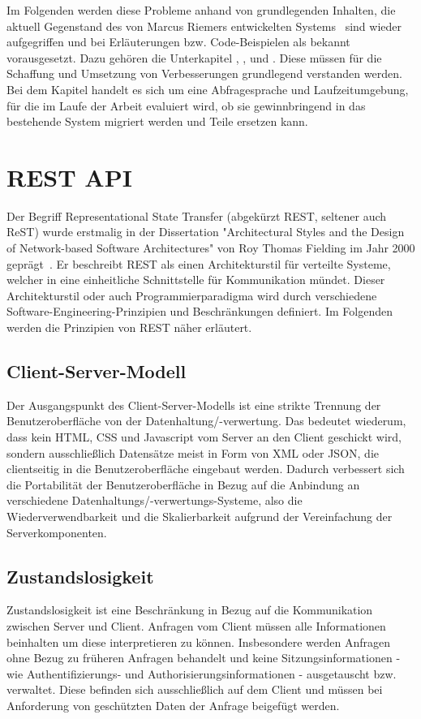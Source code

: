 Im Folgenden werden diese Probleme anhand von grundlegenden Inhalten, die aktuell Gegenstand des von Marcus Riemers entwickelten Systems~\cite{riemer2016} sind 
wieder aufgegriffen und bei Erläuterungen bzw. Code-Beispielen als bekannt vorausgesetzt.
Dazu gehören die Unterkapitel , ,  und .
Diese müssen für die Schaffung und Umsetzung von Verbesserungen grundlegend verstanden werden.
Bei dem Kapitel  handelt es sich um eine Abfragesprache und Laufzeitumgebung,
für die im Laufe der Arbeit evaluiert wird, ob sie gewinnbringend in das bestehende System migriert werden und Teile ersetzen kann.

\section{REST API}
\label{sec:basics:restapi}
Der Begriff Representational State Transfer (abgekürzt REST, seltener auch ReST) wurde erstmalig in der Dissertation "Architectural Styles and the Design of
Network-based Software Architectures" von Roy Thomas Fielding im Jahr 2000 geprägt~\cite{fielding-dissertation}.
Er beschreibt REST als einen Architekturstil für verteilte Systeme, welcher in eine einheitliche Schnittstelle für Kommunikation mündet.
Dieser Architekturstil oder auch Programmierparadigma wird durch verschiedene Software-Engineering-Prinzipien und Beschränkungen definiert.
Im Folgenden werden die Prinzipien von REST näher erläutert.

\subsection{Client-Server-Modell}
Der Ausgangspunkt des Client-Server-Modells ist eine strikte Trennung der Benutzeroberfläche von der Datenhaltung/-verwertung.
Das bedeutet wiederum, dass kein HTML, CSS und Javascript vom Server an den Client geschickt wird, sondern ausschließlich Datensätze
meist in Form von XML oder JSON, die clientseitig in die Benutzeroberfläche eingebaut werden.
Dadurch verbessert sich die Portabilität der Benutzeroberfläche in Bezug auf die Anbindung an verschiedene Datenhaltungs/-verwertungs-Systeme,
also die Wiederverwendbarkeit und die Skalierbarkeit aufgrund der Vereinfachung der Serverkomponenten.

\subsection{Zustandslosigkeit}
Zustandslosigkeit ist eine Beschränkung in Bezug auf die Kommunikation zwischen Server und Client.
Anfragen vom Client müssen alle Informationen beinhalten um diese interpretieren zu können.
Insbesondere werden Anfragen ohne Bezug zu früheren Anfragen behandelt und keine Sitzungsinformationen -
wie Authentifizierungs- und Authorisierungsinformationen - ausgetauscht bzw. verwaltet.
Diese befinden sich ausschließlich auf dem Client und müssen bei Anforderung von geschützten Daten der Anfrage beigefügt werden.

